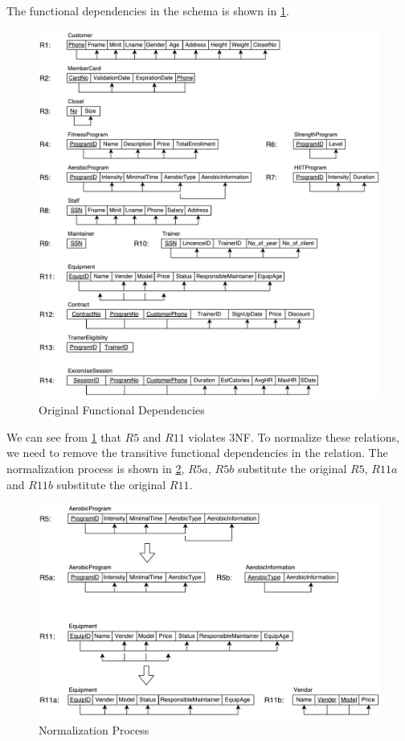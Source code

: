 \documentclass[12pt,letterpaper,titlepage,en-US]{article}
\begin{document}
\pagebreak
The functional dependencies in the schema is shown in \cref{fd}.
\begin{figure}[H]
    \caption{Original Functional Dependencies}\label{fd}
    \centering
    \includegraphics[width=\textwidth]{img/fd}
\end{figure}

We can see from \cref{fd} that $R5$ and $R11$ violates 3NF.
To normalize these relations, we need to remove the transitive functional dependencies in the relation.
The normalization process is shown in \cref{norm}, $R5a$, $R5b$ substitute the original $R5$, $R11a$ and $R11b$ substitute the original $R11$.
\begin{figure}[H]
    \caption{Normalization Process}\label{norm}
    \centering
    \includegraphics[width=\textwidth]{img/norm}
\end{figure}
\end{document}
